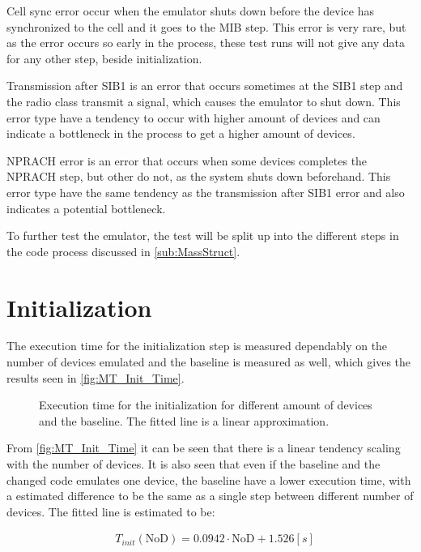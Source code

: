 Cell sync error occur when the emulator shuts down before the device has synchronized to the cell and it goes to the MIB step. This error is very rare, but as the error occurs so early in the process, these test runs will not give any data for any other step, beside initialization.

Transmission after SIB1 is an error that occurs sometimes at the SIB1 step and the radio class transmit a signal, which causes the emulator to shut down. This error type have a tendency to occur with higher amount of devices and can indicate a bottleneck in the process to get a higher amount of devices.

NPRACH error is an error that occurs when some devices completes the NPRACH step, but other do not, as the system shuts down beforehand. This error type have the same tendency as the transmission after SIB1 error and also indicates a potential bottleneck.

To further test the emulator, the test will be split up into the different steps in the code process discussed in \autoref{sub:MassStruct}.

\section{Initialization}
The execution time for the initialization step is measured dependably on the number of devices emulated and the baseline is measured as well, which gives the results seen in \autoref{fig:MT_Init_Time}.


\begin{figure}[H]
\centering
\resizebox{0.7\textwidth}{!}{
}
\caption{Execution time for the initialization for different amount of devices and the baseline. The fitted line is a linear approximation.}
\label{fig:MT_Init_Time}
\end{figure}

From \autoref{fig:MT_Init_Time} it can be seen that there is a linear tendency scaling with the number of devices. It is also seen that even if the baseline and the changed code emulates one device, the baseline have a lower execution time, with a estimated difference to be the same as a single step between different number of devices. The fitted line is estimated to be:

\begin{align}
&T_{init} (\text{NoD}) = 0.0942 \cdot \text{NoD} + 1.526 [s]
\end{align}

